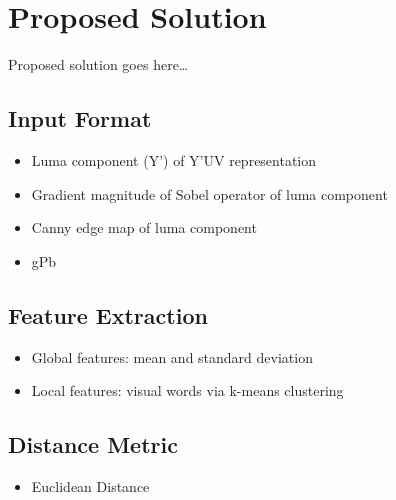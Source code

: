 \chapter{Proposed Solution}\label{ch:solution}
Proposed solution goes here\dots

\section{Input Format}
\begin{itemize}
    \item Luma component (Y') of Y'UV representation
    \item Gradient magnitude of Sobel operator of luma component
    \item Canny edge map of luma component
    \item gPb
\end{itemize}

\section{Feature Extraction}
\begin{itemize}
    \item Global features: mean and standard deviation
    \item Local features: visual words via k-means clustering
\end{itemize}

\section{Distance Metric}
\begin{itemize}
    \item Euclidean Distance
\end{itemize}
